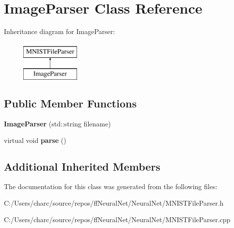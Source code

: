 \hypertarget{class_image_parser}{}\section{Image\+Parser Class Reference}
\label{class_image_parser}
Inheritance diagram for Image\+Parser\+:\begin{figure}[H]
\begin{center}
\leavevmode
\includegraphics[height=2.000000cm]{class_image_parser}
\end{center}
\end{figure}
\subsection*{Public Member Functions}
\begin{DoxyCompactItemize}
\item 
\mbox{\label{class_image_parser_a5e392f9752e88ebcec8e2d2d2334d31e}} 
{\bfseries Image\+Parser} (std\+::string filename)
\item 
\mbox{\label{class_image_parser_ad4e5313519b0ee20b30ffb64b2b9c736}} 
virtual void {\bfseries parse} ()
\end{DoxyCompactItemize}
\subsection*{Additional Inherited Members}


The documentation for this class was generated from the following files\+:\begin{DoxyCompactItemize}
\item 
C\+:/\+Users/charc/source/repos/ff\+Neural\+Net/\+Neural\+Net/M\+N\+I\+S\+T\+File\+Parser.\+h\item 
C\+:/\+Users/charc/source/repos/ff\+Neural\+Net/\+Neural\+Net/M\+N\+I\+S\+T\+File\+Parser.\+cpp\end{DoxyCompactItemize}
